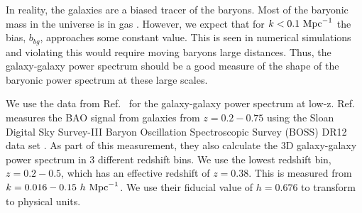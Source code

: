 \documentclass[floats,floatfix,showpacs,amssymb,amsmath,prl,twocolumn,superscriptaddress,nofootinbib, aps]{revtex4-2}
\begin{document}
In reality, the galaxies are a biased tracer of the baryons. Most of the baryonic mass in the universe is in gas \citep{deGraaff2019}. However, we expect that for $k<0.1~\rm{Mpc}^{-1}$ the bias, $b_{bg}$, approaches some constant value. This is seen in numerical simulations \citep[e.g.,][]{Springel2018} and violating this would require moving baryons large distances. Thus, the galaxy-galaxy power spectrum should be a good measure of the shape of the baryonic power spectrum at these large scales.

We use the data from Ref.~\cite{Beutler2016} for the galaxy-galaxy power spectrum at low-z. Ref.~\cite{Beutler2016} measures the BAO signal from galaxies from $z=0.2-0.75$ using the Sloan Digital Sky Survey-III \citep[SDSS-III;][]{Eisenstein2011} Baryon Oscillation Spectroscopic Survey (BOSS) DR12 data set \citep{Dawson2013,Alam2015}. As part of this measurement, they also calculate the 3D galaxy-galaxy power spectrum in 3 different redshift bins. We use the lowest redshift bin, $z=0.2-0.5$, which has an effective redshift of $z=0.38$. This is measured from $k=0.016 - 0.15~h~\rm{Mpc}^{-1}$. We use their fiducial value of $h=0.676$ to transform to physical units.


\end{document}
